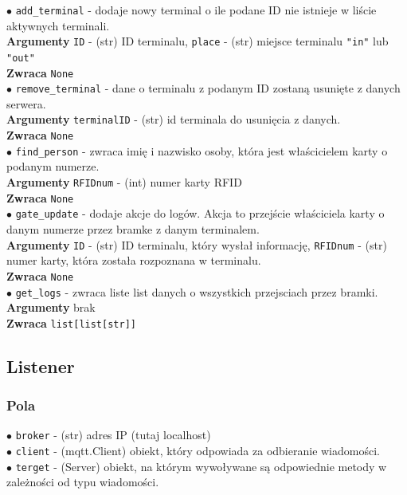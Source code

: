 \documentclass{article}
\begin{document}
$\bullet$ \texttt{add\_terminal} - dodaje nowy terminal o ile podane
ID nie istnieje w liście aktywnych terminali. \\
\textbf{Argumenty} \texttt{ID} - (str) ID terminalu,
\texttt{place} - (str) miejsce terminalu 
\texttt{"in"} lub \texttt{"out"} \\
\textbf{Zwraca} \texttt{None} \\

$\bullet$ \texttt{remove\_terminal} - dane o terminalu z podanym
ID zostaną usunięte z danych serwera. \\
\textbf{Argumenty} \texttt{terminalID} - (str) id terminala do 
usunięcia z danych. \\
\textbf{Zwraca} \texttt{None} \\

\newpage
$\bullet$ \texttt{find\_person} - zwraca imię i nazwisko osoby, 
która jest właścicielem karty o podanym numerze.\\
\textbf{Argumenty} \texttt{RFIDnum} - (int) numer karty RFID \\
\textbf{Zwraca} \texttt{None} \\

$\bullet$ \texttt{gate\_update} - dodaje akcje do logów.
Akcja to przejście właściciela karty o danym numerze przez 
bramke z danym terminalem.\\
\textbf{Argumenty} \texttt{ID} - (str) ID terminalu, który
wysłał informację, \texttt{RFIDnum} -
(str) numer karty, która została rozpoznana w terminalu.\\
\textbf{Zwraca} \texttt{None} \\

$\bullet$ \texttt{get\_logs} - zwraca liste list danych o wszystkich
przejsciach przez bramki.\\
\textbf{Argumenty} brak \\
\textbf{Zwraca} \texttt{list[list[str]]} \\

\subsection{Listener}
\subsubsection{Pola}

$\bullet$ \texttt{broker} - (str) adres IP (tutaj localhost) \\
$\bullet$ \texttt{client} - (mqtt.Client) obiekt, który odpowiada za
odbieranie wiadomości. \\
$\bullet$ \texttt{terget} - (Server) obiekt, na którym wywoływane 
są odpowiednie metody w zależności od typu wiadomości.
\end{document}
